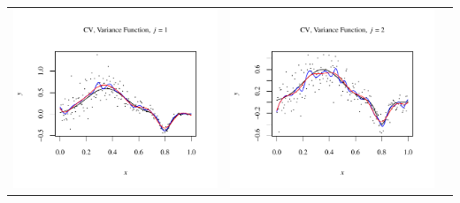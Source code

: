 \documentclass[11pt]{article}
\begin{document}
\begin{table}[h!]
  \begin{center}
    \renewcommand{\arraystretch}{1.5}
    \begin{tabular}{| >{\centering\arraybackslash}m{2.1in} |  >{\centering\arraybackslash}m{2.1in} |  >{\centering\arraybackslash}m{2.1in}|}
      \hline
      \includegraphics[width=1\linewidth,height=0.18\textheight]{Graphs/1/4/assignment5_a_1_4_1}&
      \includegraphics[width=1\linewidth,height=0.18\textheight]{Graphs/1/4/assignment5_a_1_4_2}&

\end{tabular}
\end{center}
\end{table}
\end{document}
